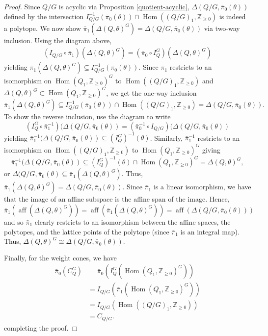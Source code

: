 \documentclass[12pt]{amsart}
\theoremstyle{plain}
\theoremstyle{definition}
\newcommand{\Z}{\mathbb{Z}}
\DeclareMathOperator{\Hom}{Hom}
\DeclareMathOperator{\aff}{aff}
\renewcommand{\hom}{\Hom}
\begin{document}
\begin{proof}
Since $Q/G$ is acyclic via Proposition \ref{quotient-acyclic}, $\Delta(Q/G, \bar\pi_0(\theta))$ defined by the intersection $ I_{Q/G}^{-1}(\bar\pi_0(\theta))\cap \hom((Q/G)_1, \Z_{\geq0})$ is indeed a polytope. We now show $\bar\pi_1(\Delta(Q, \theta)^G) = \Delta(Q/G, \bar\pi_0(\theta))$ via two-way inclusion. Using the diagram above, 
\begin{align*}
    (I_{Q/G} \circ \bar\pi_1)(\Delta(Q, \theta)^G) = (\bar\pi_0\circ I_Q^G)(\Delta(Q, \theta)^G)
\end{align*}
yielding $\bar\pi_1(\Delta(Q, \theta)^G)\subseteq I_{Q/G}^{-1}(\bar\pi_0(\theta))$. Since $\bar\pi_1$ restricts to an isomorphism on $\hom(Q_1, \Z_{\geq0})^G$ to $\hom((Q/G)_1, \Z_{\geq 0})$ and $\Delta(Q, \theta)^G \subset \hom(Q_1, \Z_{\geq0})^G$, we get the one-way inclusion
\[
\bar\pi_1(\Delta(Q, \theta)^G) \subseteq I_{Q/G}^{-1}(\bar\pi_0(\theta)) \cap \hom((Q/G)_1, \Z_{\geq 0}) = \Delta(Q/G, \bar\pi_0(\theta)).
\]
To show the reverse inclusion, use the diagram to write
\[
(I_Q^G \circ \bar\pi^{-1}_1)(\Delta(Q/G, \bar\pi_0(\theta)) = (\bar\pi_0^{-1} \circ I_{Q/G})(\Delta(Q/G, \bar\pi_0(\theta))
\]
yielding $\bar\pi^{-1}_1(\Delta(Q/G, \bar\pi_0(\theta)) \subseteq (I_Q^G)^{-1}(\theta)$. Similarly, $\bar\pi_1^{-1}$ restricts to an isomorphism on $\hom((Q/G)_1, \Z_{\geq 0})$ to $\hom(Q_1, \Z_{\geq0})^G$ giving
\[
\bar\pi^{-1}_1(\Delta(Q/G, \bar\pi_0(\theta)) \subseteq (I_Q^G)^{-1}(\theta)\cap \hom(Q_1, \Z_{\geq0})^G = \Delta(Q, \theta)^G,
\]
or $\Delta(Q/G, \bar\pi_0(\theta) \subseteq \bar\pi_1(\Delta(Q, \theta)^G)$. Thus, $\bar\pi_1(\Delta(Q, \theta)^G) = \Delta(Q/G, \bar\pi_0(\theta))$. Since $\bar\pi_1$ is a linear isomorphism, we have that the image of an affine subspace is the affine span of the image. Hence, $\bar\pi_1(\aff(\Delta(Q, \theta)^G)) = \aff(\bar\pi_1(\Delta(Q, \theta)^G)) = \aff(\Delta(Q/G, \bar\pi_0(\theta)))$ and so $\bar\pi_1$ clearly restricts to an isomorphism between the affine spaces, the polytopes, and the lattice points of the polytope (since $\bar\pi_1$ is an integral map). Thus, $\Delta(Q, \theta)^G \cong \Delta(Q/G, \bar\pi_0(\theta)).$

Finally, for the weight cones, we have
\begin{align*}
    \bar\pi_0(C_Q^G) &= \bar\pi_0(I_Q^G(\hom(Q_1, \Z_{\geq 0})^G)) \\ 
    &= I_{Q/G}(\bar\pi_1(\hom(Q_1, \Z_{\geq 0})^G)) \\ 
    &= I_{Q/G}(\hom((Q/G)_1, \Z_{\geq 0})) \\
    &= C_{Q/G}.
\end{align*}
completing the proof.
\end{proof}
\end{document}
